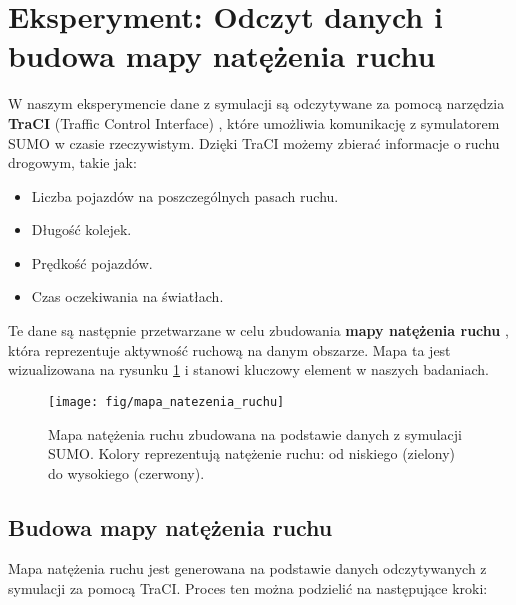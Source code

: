 \documentclass[12pt, a4paper]{article} %
\begin{document}
    \section{Eksperyment: Odczyt danych i budowa mapy natężenia ruchu}

    W naszym eksperymencie dane z symulacji są odczytywane za pomocą narzędzia
    \textbf{TraCI} (Traffic Control Interface)
    , które umożliwia komunikację z symulatorem SUMO w czasie rzeczywistym. Dzięki TraCI możemy zbierać informacje o
    ruchu drogowym, takie jak:
    \begin{itemize}
        \item Liczba pojazdów na poszczególnych pasach ruchu.
        \item Długość kolejek.
        \item Prędkość pojazdów.
        \item Czas oczekiwania na światłach.
    \end{itemize}

    Te dane są następnie przetwarzane w celu zbudowania \textbf{mapy natężenia ruchu}
    , która reprezentuje aktywność ruchową na danym obszarze. Mapa ta jest wizualizowana na rysunku
    \ref{fig:mapa_natezenia_ruchu} i stanowi kluczowy element w naszych badaniach.

    \begin{figure}[h]
        \centering
        \texttt{[image: fig/mapa\_natezenia\_ruchu]}
        \caption
        {Mapa natężenia ruchu zbudowana na podstawie danych z symulacji SUMO. Kolory reprezentują natężenie ruchu: od
        niskiego (zielony) do wysokiego (czerwony).}
        \label{fig:mapa_natezenia_ruchu}
    \end{figure}

    \subsection{Budowa mapy natężenia ruchu}
    Mapa natężenia ruchu jest generowana na podstawie danych odczytywanych z symulacji za pomocą TraCI. Proces ten można
    podzielić na następujące kroki:
\end{document}

